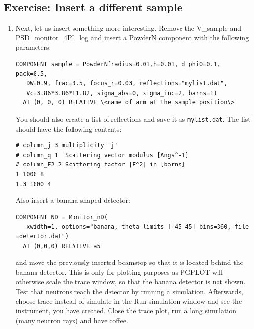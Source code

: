 \subsection{Exercise: Insert a different sample}
\begin{enumerate}
\item{Next, let us insert something more interesting. Remove the V\_sample and  PSD\_monitor\_4PI\_log and insert a PowderN component with the following parameters:
    \begin{verbatim}
COMPONENT sample = PowderN(radius=0.01,h=0.01, d_phi0=0.1, pack=0.5, 
   DW=0.9, frac=0.5, focus_r=0.03, reflections="mylist.dat",
   Vc=3.86*3.86*11.82, sigma_abs=0, sigma_inc=2, barns=1)
  AT (0, 0, 0) RELATIVE \<name of arm at the sample position\>
\end{verbatim}
You should also create a list of reflections and save it as \texttt{mylist.dat}. The list should have the following contents:
\begin{verbatim}
# column_j 3 multiplicity 'j'
# column_q 1  Scattering vector modulus [Angs^-1]
# column_F2 2 Scattering factor |F^2| in [barns]
1 1000 8
1.3 1000 4
\end{verbatim}

Also insert a banana shaped detector:
\begin{verbatim}
COMPONENT ND = Monitor_nD(
   xwidth=1, options="banana, theta limits [-45 45] bins=360, file =detector.dat")
  AT (0,0,0) RELATIVE a5
\end{verbatim}
and move the previously inserted beamstop so that it is located behind the banana detector. This is only for plotting purposes as PGPLOT will otherwise scale the trace window, so that the banana detector is not shown. Test that neutrons reach the detector by running a simulation. Afterwards, choose trace instead of simulate in the Run simulation window and see the instrument, you have created. Close the trace plot, run a long simulation (many neutron rays) and have coffee.}
\end{enumerate}
